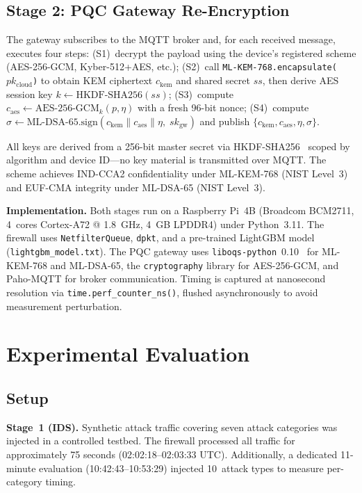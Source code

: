 \documentclass[conference]{IEEEtran}
\begin{document}
\subsection{Stage 2: PQC Gateway Re-Encryption}

The gateway subscribes to the MQTT broker and, for each received message, executes four steps: (S1)~decrypt the payload using the device's registered scheme (AES-256-GCM, Kyber-512+AES, etc.); (S2)~call \texttt{ML-KEM-768.encapsulate($pk_\text{cloud}$)} to obtain KEM ciphertext $c_\text{kem}$ and shared secret $ss$, then derive AES session key $k \leftarrow \text{HKDF-SHA256}(ss)$; (S3)~compute $c_\text{aes} \leftarrow \text{AES-256-GCM}_k(p, \eta)$ with a fresh 96-bit nonce; (S4)~compute $\sigma \leftarrow \text{ML-DSA-65.sign}(c_\text{kem} \| c_\text{aes} \| \eta,\; sk_\text{gw})$ and publish $\{c_\text{kem}, c_\text{aes}, \eta, \sigma\}$.

All keys are derived from a 256-bit master secret via HKDF-SHA256~\cite{rfc5869} scoped by algorithm and device ID---no key material is transmitted over MQTT. The scheme achieves IND-CCA2 confidentiality under ML-KEM-768 (NIST Level~3) and EUF-CMA integrity under ML-DSA-65 (NIST Level~3).

\textbf{Implementation.} Both stages run on a Raspberry Pi~4B (Broadcom BCM2711, 4~cores Cortex-A72 @ 1.8~GHz, 4~GB LPDDR4) under Python~3.11. The firewall uses \texttt{NetfilterQueue}, \texttt{dpkt}, and a pre-trained LightGBM model (\texttt{lightgbm\_model.txt}). The PQC gateway uses \texttt{liboqs-python}~0.10~\cite{oqs2023} for ML-KEM-768 and ML-DSA-65, the \texttt{cryptography} library for AES-256-GCM, and Paho-MQTT for broker communication. Timing is captured at nanosecond resolution via \texttt{time.perf\_counter\_ns()}, flushed asynchronously to avoid measurement perturbation.

\section{Experimental Evaluation}

\subsection{Setup}

\textbf{Stage~1 (IDS).} Synthetic attack traffic covering seven attack categories was injected in a controlled testbed. The firewall processed all traffic for approximately 75 seconds (02:02:18--02:03:33 UTC). Additionally, a dedicated 11-minute evaluation (10:42:43--10:53:29) injected 10~attack types to measure per-category timing.
\end{document}
